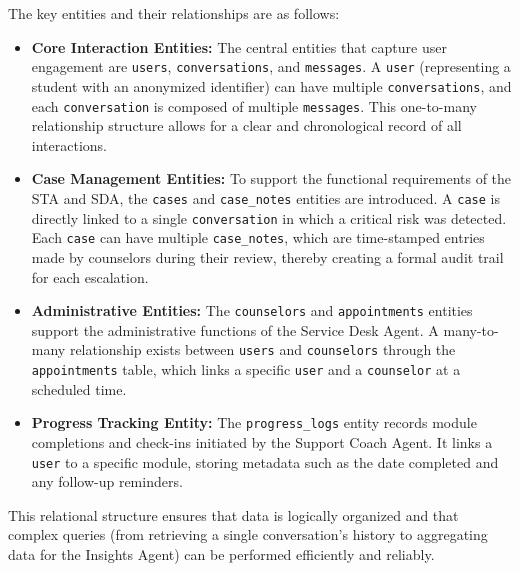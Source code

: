The key entities and their relationships are as follows:
\begin{itemize}
    \item \textbf{Core Interaction Entities:} The central entities that capture user engagement are \texttt{users}, \texttt{conversations}, and \texttt{messages}. A \texttt{user} (representing a student with an anonymized identifier) can have multiple \texttt{conversations}, and each \texttt{conversation} is composed of multiple \texttt{messages}. This one-to-many relationship structure allows for a clear and chronological record of all interactions.
    \item \textbf{Case Management Entities:} To support the functional requirements of the STA and SDA, the \texttt{cases} and \texttt{case\_notes} entities are introduced. A \texttt{case} is directly linked to a single \texttt{conversation} in which a critical risk was detected. Each \texttt{case} can have multiple \texttt{case\_notes}, which are time-stamped entries made by counselors during their review, thereby creating a formal audit trail for each escalation.
    \item \textbf{Administrative Entities:} The \texttt{counselors} and \texttt{appointments} entities support the administrative functions of the Service Desk Agent. A many-to-many relationship exists between \texttt{users} and \texttt{counselors} through the \texttt{appointments} table, which links a specific \texttt{user} and a \texttt{counselor} at a scheduled time.
    \item \textbf{Progress Tracking Entity:} The \texttt{progress\_logs} entity records module completions and check-ins initiated by the Support Coach Agent. It links a \texttt{user} to a specific module, storing metadata such as the date completed and any follow-up reminders.
\end{itemize}

This relational structure ensures that data is logically organized and that complex queries (from retrieving a single conversation's history to aggregating data for the Insights Agent) can be performed efficiently and reliably.

